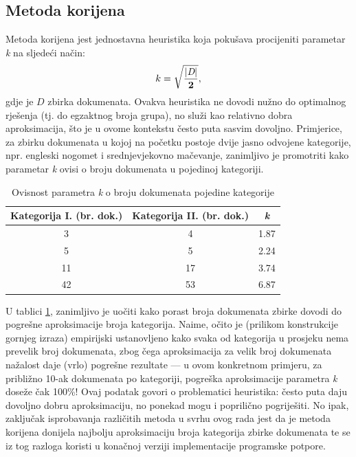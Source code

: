\documentclass[times, utf8, zavrsni]{fer}
\begin{document}

%

\subsection{Metoda korijena}
Metoda korijena jest jednostavna heuristika koja pokušava procijeniti parametar \textit{k} na sljedeći način:
\begin{equation}
{k}={\mathbf {\sqrt{|\textit{D}| \over 2}}},
\end{equation}
gdje je $D$ zbirka dokumenata. Ovakva heuristika ne dovodi nužno do optimalnog rješenja (tj. do egzaktnog broja grupa), no služi kao relativno dobra aproksimacija, što je u ovome kontekstu često puta sasvim dovoljno. Primjerice, za zbirku dokumenata u kojoj na početku postoje dvije jasno odvojene kategorije, npr. engleski nogomet i srednjevjekovno mačevanje, zanimljivo je promotriti kako parametar \textit{k} ovisi o broju dokumenata u pojedinoj kategoriji.

\begin{table}
\begin{center}
\begin{tabular}{|c|c|c|}
\hline
Kategorija I. (br. dok.) & Kategorija II. (br. dok.) & \textit{k} \\
\hline
3 & 4 & 1.87 \\
5 & 5 & 2.24 \\
11 & 17 & 3.74 \\
42 & 53 & 6.87 \\
\hline
\end{tabular}
\end{center}
\caption{Ovisnost parametra \textit{k} o broju dokumenata pojedine kategorije}
\label{table:kmeans}
\end{table}

U tablici \ref{table:kmeans}, zanimljivo je uočiti kako porast broja dokumenata zbirke dovodi do pogrešne aproksimacije broja kategorija. Naime, očito je (prilikom konstrukcije gornjeg izraza) empirijski ustanovljeno kako svaka od kategorija u prosjeku nema prevelik broj dokumenata, zbog čega aproksimacija za velik broj dokumenata nažalost daje (vrlo) pogrešne rezultate — u ovom konkretnom primjeru, za približno 10-ak dokumenata po kategoriji, pogreška aproksimacije parametra \textit{k} doseže čak 100\%! Ovaj podatak govori o problematici heuristika: često puta daju dovoljno dobru aproksimaciju, no ponekad mogu i poprilično pogriješiti.
No ipak, zaključak isprobavanja različitih metoda u svrhu ovog rada jest da je metoda korijena donijela najbolju aproksimaciju broja kategorija zbirke dokumenata te se iz tog razloga koristi u konačnoj verziji implementacije programske potpore.
\end{document}
